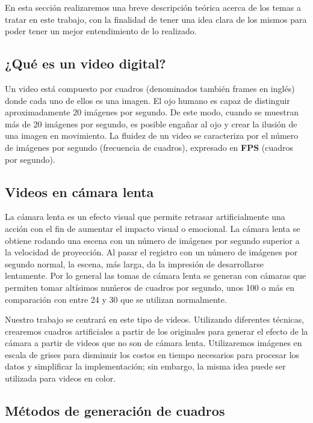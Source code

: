 En esta secci\'on realizaremos una breve descripci\'on te\'orica acerca de los temas a tratar en este trabajo, con la finalidad de tener una idea clara de los mismos para poder tener un mejor entendimiento de lo realizado.

\subsection{¿Qu\'e es un video digital?}

Un video est\'a compuesto por cuadros (denominados tambi\'en frames en ingl\'es) donde cada uno de ellos es una imagen. El ojo humano es capaz de distinguir aproximadamente 20 im\'agenes por segundo. De este modo, cuando se muestran m\'as de 20 imágenes por segundo, es posible enga\~nar al ojo y crear la ilusi\'on de una imagen en movimiento. La fluidez de un video se caracteriza por el número de im\'agenes por segundo (frecuencia de cuadros), expresado en \textbf{FPS} (cuadros por segundo). 

\subsection{Videos en c\'amara lenta}

La c\'amara lenta es un efecto visual que permite retrasar artificialmente una acci\'on con el fin de aumentar el impacto visual o emocional. La c\'amara lenta se obtiene rodando una escena con un n\'umero de im\'agenes por segundo superior a la velocidad de proyecci\'on. Al pasar el registro con un n\'umero de im\'agenes por segundo normal, la escena, m\'as larga, da la impresión de desarrollarse lentamente. Por lo general las tomas de c\'amara lenta se generan con c\'amaras que permiten tomar alt\'isimos nu\'meros de cuadros por segundo, unos 100 o m\'as en comparaci\'on con entre 24 y 30 que se utilizan normalmente.

Nuestro trabajo se centrar\'a en este tipo de videos. Utilizando diferentes t\'ecnicas, crearemos cuadros artificiales a partir de los originales para generar el efecto de la c\'amara a partir de videos que no son de c\'amara lenta. Utilizaremos im\'agenes  en escala de grises para disminuir los costos en tiempo necesarios para procesar los datos y simplificar la implementaci\'on; sin embargo, la misma idea puede ser utilizada para videos en color.

\subsection{M\'etodos de generaci\'on de cuadros}

